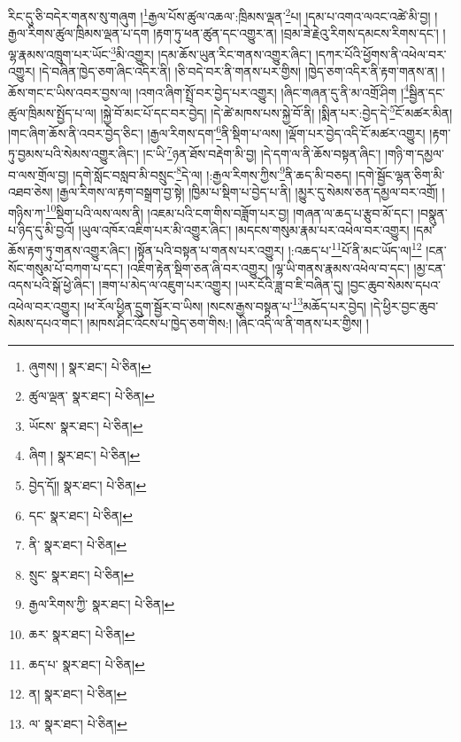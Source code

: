རིང་དུ་ཅི་བདེར་གནས་སུ་གཞུག །\footnote{ཞུགས། །  སྣར་ཐང་།  པེ་ཅིན། }རྒྱལ་པོས་ཚུལ་འཆལ་:ཁྲིམས་ལྡན་\footnote{ཚུལ་ལྡན་  སྣར་ཐང་།  པེ་ཅིན། }པ། །དམ་པ་འགའ་ལའང་འཚེ་མི་བྱ། །རྒྱལ་རིགས་ཚུལ་ཁྲིམས་ལྡན་པ་དག །རྟག་ཏུ་ཕན་ཚུན་དང་འགྱུར་ན། །བྲམ་ཟེ་རྗེའུ་རིགས་དམངས་རིགས་དང་། །ལྷ་རྣམས་འཁྲུག་པར་ཡོང་\footnote{ཡོངས་  སྣར་ཐང་།  པེ་ཅིན། }མི་འགྱུར། །དམ་ཆོས་ཡུན་རིང་གནས་འགྱུར་ཞིང་། །དཀར་པོའི་ཕྱོགས་ནི་འཕེལ་བར་འགྱུར། །དེ་བཞིན་ཁྱེད་ཅག་ཞིང་འདིར་ནི། །ཅི་བདེ་བར་ནི་གནས་པར་གྱིས། །ཁྱེད་ཅག་འདིར་ནི་རྟག་གནས་ན། །ཆོས་གང་ང་ཡིས་འབར་བྱས་ལ། །འགའ་ཞིག་སྤྲོ་བར་བྱེད་པར་འགྱུར། །ཞིང་གཞན་དུ་ནི་མ་འགྲོ་ཤིག །\footnote{ཞིག །  སྣར་ཐང་།  པེ་ཅིན། }སྦྱིན་དང་ཚུལ་ཁྲིམས་སྤྱོད་པ་ལ། །སྐྱེ་བོ་མང་པོ་དང་བར་བྱེད། །དེ་ཚེ་མཁས་པས་སྐྱེ་བོ་ནི། །སྨིན་པར་:བྱེད་དེ་\footnote{བྱེད་དོ།།  སྣར་ཐང་།  པེ་ཅིན། }ངོ་མཚར་མིན། །གང་ཞིག་ཆོས་ནི་འབར་བྱེད་ཅིང་། །རྒྱལ་རིགས་དག་\footnote{དང་  སྣར་ཐང་།  པེ་ཅིན། }ནི་སྡིག་པ་ལས། །ལྡོག་པར་བྱེད་འདི་ངོ་མཚར་འགྱུར། །རྟག་ཏུ་བྱམས་པའི་སེམས་འགྱུར་ཞིང་། །ང་ཡི་\footnote{ནི་  སྣར་ཐང་།  པེ་ཅིན། }ཉན་ཐོས་བརྡེག་མི་བྱ། །དེ་དག་ལ་ནི་ཆོས་བསྟན་ཞིང་། །གཉི་ག་དམྱལ་བ་ལས་གྲོལ་བྱ། །དགེ་སློང་བསླབ་མི་བསྲུང་\footnote{སྲུང་  སྣར་ཐང་།  པེ་ཅིན། }དེ་ལ། །:རྒྱལ་རིགས་ཀྱིས་\footnote{རྒྱལ་རིགས་ཀྱི་  སྣར་ཐང་།  པེ་ཅིན། }ནི་ཆད་མི་བཅད། །དགེ་སྦྱོང་ལྷན་ཅིག་མི་འཐབ་ཅེས། །རྒྱལ་རིགས་ལ་རྟག་བསྒྲག་བྱ་སྟེ། །ཁྱིམ་པ་སྡིག་པ་བྱེད་པ་ནི། །མྱུར་དུ་སེམས་ཅན་དམྱལ་བར་འགྲོ། །གཉིས་ཀ་\footnote{ཆར་  སྣར་ཐང་།  པེ་ཅིན། }སྡིག་པའི་ལས་ལས་ནི། །འཇམ་པའི་ངག་གིས་བཟློག་པར་བྱ། །གཞན་ལ་ཆད་པ་རྩུབ་མོ་དང་། །བསྣུན་པ་ཉིད་དུ་མི་བྱའོ། །ཡུལ་འཁོར་འཇིག་པར་མི་འགྱུར་ཞིང་། །མདངས་གསུམ་རྣམ་པར་འཕེལ་བར་འགྱུར། །དམ་ཆོས་རྟག་ཏུ་གནས་འགྱུར་ཞིང་། །སྟོན་པའི་བསྟན་པ་གནས་པར་འགྱུར། །:འཆད་པ་\footnote{ཆད་པ་  སྣར་ཐང་།  པེ་ཅིན། }པོ་ནི་མང་ཡོད་ལ།\footnote{ན།  སྣར་ཐང་།  པེ་ཅིན། } །ངན་སོང་གསུམ་པོ་བཀག་པ་དང་། །འཇིག་རྟེན་སྡིག་ཅན་ཞི་བར་འགྱུར། །ལྷ་ཡི་གནས་རྣམས་འཕེལ་བ་དང་། །མྱ་ངན་འདས་པའི་སྒོ་ཕྱེ་ཞིང་། །ཟག་པ་མེད་ལ་འཇུག་པར་འགྱུར། །ཡར་ངོའི་ཟླ་བ་ཇི་བཞིན་དུ། །བྱང་ཆུབ་སེམས་དཔའ་འཕེལ་བར་འགྱུར། །ཕ་རོལ་ཕྱིན་དྲུག་སྦྱོར་བ་ཡིས། །སངས་རྒྱས་བསྟན་པ་\footnote{ལ་  སྣར་ཐང་།  པེ་ཅིན། }མཆོད་པར་བྱེད། །དེ་ཕྱིར་བྱང་ཆུབ་སེམས་དཔའ་གང་། །མཁས་ཤིང་འོངས་པ་ཁྱེད་ཅག་གིས:། །ཞིང་འདི་ལ་ནི་གནས་པར་གྱིས། །
